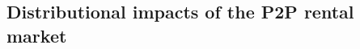\documentclass[11pt]{article}
\newtheorem{prop}{Proposition}
\begin{document}
\subsection{Distributional impacts of the P2P rental market} 


\end{document}
